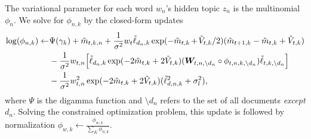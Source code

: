 The variational parameter for each word $w_n$'s hidden topic $z_n$ is
the multinomial $\phi_n$.  We solve for $\phi_{n,k}$ by the
closed-form updates
\begin{align}
\label{eq:phi_update}
\log(\phi_{n,k}) \gets & \Psi(\gamma_k) + \tilde{m}_{t,k,n} + \frac{1}{\sigma^2} w_{t} \tilde{\ell}_{d_n,k} \exp(-\tilde{m}_{t,k} \hspace{-1pt} + \hspace{-1pt} \tilde{V}_{t,k} / 2) (\tilde{m}_{t+1,k} - \tilde{m}_{t,k} + \tilde{V}_{t,k})  \nonumber \\ 
& - \frac{1}{\sigma^2} w_{t,n} \Big[ \tilde{\ell}_{d_n,k} \exp(-2\tilde{m}_{t,k} + 2 \tilde{V}_{t,k})
 (\bm W_{t,n,\setminus{d_n}} \circ \phi_{t,n,k,\setminus{d_n}}) \tilde{\ell}_{t,k,\setminus d_n} \Big] \nonumber \\
& - \frac{1}{\sigma^2} w_{t,n}^2 \exp(-2\tilde{m}_{t,k} + 2 \tilde{V}_{t,k}) (\tilde{\ell}_{d,n,k}^2 + \sigma_l^2),
\end{align}
where $\Psi$ is the digamma function and $\setminus{d_n}$ refers to
the set of all documents \emph{except} $d_n$. Solving the constrained
optimization problem, this update is followed by normalization
$\phi_{w, k} \gets \frac{\phi_{w, k}}{\sum_K \phi_{n, k}}$.

